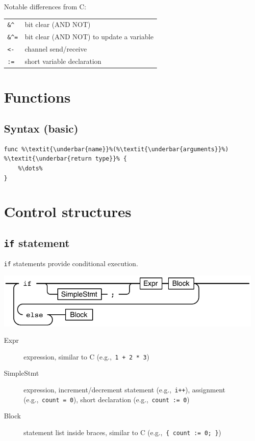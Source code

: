 \documentclass{article}
\begin{document}
\begin{multicols*}{3}
  Notable differences from C:

  \begin{tabular}{ll}
    \texttt{\&\textasciicircum} & bit clear (AND NOT) \\
    \texttt{\&\textasciicircum=} & bit clear (AND NOT) to update a variable \\
    \texttt{<-} & channel send/receive \\
    \texttt{:=} & short variable declaration     \\
  \end{tabular}

  \filbreak
  \section*{Functions}

  \subsection*{Syntax (basic)}

  \begin{lstlisting}[numbers=none,escapechar=\%]
func %\textit{\underbar{name}}%(%\textit{\underbar{arguments}}%) %\textit{\underbar{return type}}% {
    %\dots%
}
\end{lstlisting}

  \filbreak
  \section*{Control structures}

  \subsection*{\texttt{if} statement}

  \lstinline{if} statements provide conditional execution.

  \includegraphics[width=\linewidth]{if}

  \begin{description}
  \item[Expr] expression, similar to C (e.g.,~\lstinline{1 + 2 * 3})
  \item[SimpleStmt] expression, increment/decrement statement (e.g.,~\lstinline{i++}), assignment (e.g.,~\lstinline{count = 0}), short declaration (e.g.,~\lstinline{count := 0})
  \item[Block] statement list inside braces, similar to C (e.g.,~\lstinline!{ count := 0; }!)
  \end{description}


\end{multicols*}
\end{document}
